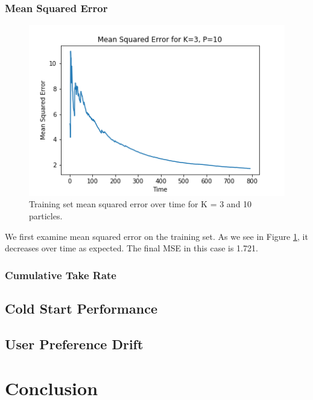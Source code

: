 \documentclass{article}
\begin{document}
\subsubsection{Mean Squared Error}
\begin{figure}[ht]

\begin{center}
\centerline{\includegraphics[width=\columnwidth]{TrainMSE}}
\caption{Training set mean squared error over time for K = 3 and 10 particles.}
\label{TrainMSE}
\end{center}

\vskip -0.2in
\end{figure}

We first examine mean squared error on the training set. As we see in Figure \ref{TrainMSE}, it decreases
over time as expected. The final MSE in this case is 1.721.



\subsubsection{Cumulative Take Rate}

\subsection{Cold Start Performance}

\subsection{User Preference Drift}

\section{Conclusion}

\nocite{kawale2015efficient}
\nocite{wang2017online}
\nocite{zhao2013interactive}
\nocite{cherkassky2013sequential}
\nocite{arulampalam2002tutorial}
\nocite{douc2005comparison}



\end{document}
